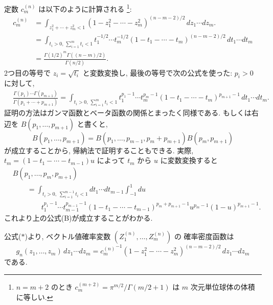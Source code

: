 \documentclass[12pt,twoside]{jarticle}
\theoremstyle{jplain}
\theoremstyle{jplain}
\theoremstyle{jplain}
\numberwithin{theorem}{section}
\numberwithin{equation}{section}
\numberwithin{figure}{section}
\numberwithin{table}{section}
\begin{document}
定数 $c^{(n)}_{m}$ は以下のように計算される%
\footnote{$n=m+2$ のとき $c_m^{(m+2)}=\pi^{m/2}/\Gamma(m/2+1)$ 
は $m$ 次元単位球体の体積に等しい.}: 
\begin{align*}
c^{(n)}_{m}
&=
\int_{z_1^2+\cdots+z_m^2<1} 
(1-z_1^2-\cdots-z_m^2)^{(n-m-2)/2}\,dz_1\cdots dz_m. 
\\ &
= \int_{t_i>0,\, \sum_{i=1}^m t_i<1}
t_1^{-1/2}\cdots t_m^{-1/2}
(1-t_1-\cdots-t_m)^{(n-m-2)/2}\,dt_1\cdots dt_m
\\ &
= \frac{\Gamma(1/2)^m\Gamma((n-m)/2)}{\Gamma(n/2)}.
\end{align*}
2つ目の等号で $z_i=\sqrt{t_i}$ と変数変換し, 
最後の等号で次の公式を使った: $p_i>0$ に対して, 
\begin{align*}
&
\frac{\Gamma(p_1)\cdots\Gamma(p_{m+1})}{\Gamma(p_1+\cdots+p_{m+1})}
=
\int_{t_i>0,\, \sum_{i=1}^m t_i<1}
t_1^{p_1-1}\cdots t_m^{p_m-1}
(1-t_1-\cdots-t_m)^{p_{m+1}-1}\,dt_1\cdots dt_m.
\end{align*}
証明の方法はガンマ函数とベータ函数の関係とまったく同様である.
もしくは右辺を $B(p_1,\ldots,p_{m+1})$ と書くと, 
\[
B(p_1,\ldots,p_{m+1})
=B(p_1,\ldots,p_{m-1},p_m+p_{m+1})B(p_m,p_{m+1})
\tag{B}
\]
が成立することから, 帰納法で証明することもできる. 
実際, $t_m=(1-t_1-\cdots-t_{m-1})u$ によって $t_m$ から $u$ に変数変換すると
\begin{align*}
&
B(p_1,\ldots,p_m,p_{m+1})
\\ & \qquad
=
\int_{t_i>0,\;\sum_{i=1}^{m-1}t_i<1}
dt_1\cdots dt_{m-1}
\int_{-1}^1 du
\\ & \qquad\qquad
t_1^{p_1-1}\cdots t_{m-1}^{p_{m-1}-1}
(1-t_1-\cdots-t_{m-1})^{p_m+p_{m+1}-1}
u^{p_m-1}(1-u)^{p_{m+1}-1}.
\end{align*}
これより上の公式(B)が成立することがわかる.


公式($*$)より, ベクトル値確率変数 $(Z^{(n)}_1,\ldots,Z^{(n)}_m)$ の
確率密度函数は
\[
g_n(z_1,\ldots,z_m)\,dz_1\cdots dz_m
=
{c^{(n)}_{m}}^{-1}(1-z_1^2-\cdots-z_m^2)^{(n-m-2)/2}\,dz_1\cdots dz_m
\]
である. 
\end{document}
